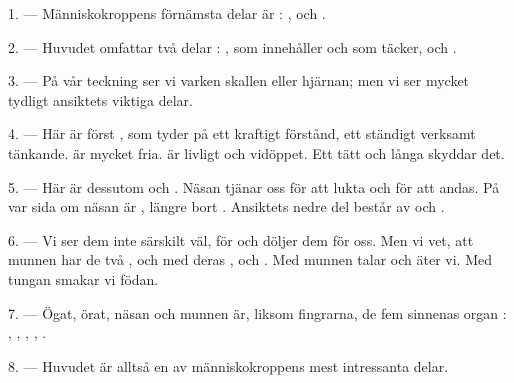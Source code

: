 
\VUsaut{4.0mm}
\VUsaut{2.0mm}

\VUsaut{2.4mm}
\VUsaut{3.0mm}

\VUsaut{3.0mm}

1. --- Människokroppens förnämsta delar är : ,  och
.

2. --- Huvudet omfattar två delar : , som innehåller
 och som  täcker, och .

3. --- På vår teckning ser vi varken skallen eller hjärnan; men vi ser mycket tydligt
ansiktets viktiga delar.

4. --- Här är först , som tyder på ett kraftigt förstånd, ett ständigt verksamt
tänkande.  är mycket fria.  är livligt och vidöppet. Ett tätt
 och långa
 skyddar det.

5. --- Här är dessutom  och . Näsan tjänar oss för att lukta
och för att andas. På var sida om näsan är , längre bort .
Ansiktets nedre del består av  och
.

6. --- Vi ser dem inte särskilt väl, för  och
 döljer dem för oss. Men vi vet, att munnen har de två
,  och  med deras
, och . Med munnen talar och äter vi. Med tungan
smakar vi födan.

7. --- Ögat, örat, näsan och munnen är, liksom fingrarna, de fem sinnenas organ :
, , , ,
.

8. --- Huvudet är alltså en av människokroppens mest intressanta delar.

